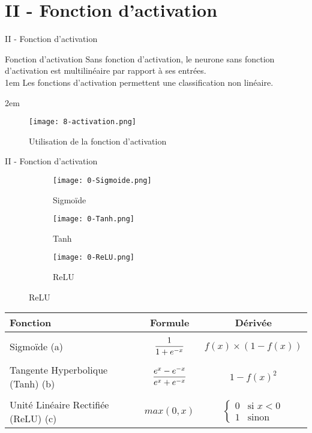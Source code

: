 \section{II - Fonction d'activation}
\begin{frame}{II - Fonction d'activation}
	\begin{block}{Fonction d'activation}
		Sans fonction d'activation, le neurone sans fonction d'activation est multilinéaire par rapport à ses entrées. \\
		\openup 1em
		Les fonctions d'activation permettent une classification non linéaire.
	\end{block}
	\openup 2em
	\begin{figure}
		\centering
		\texttt{[image: 8-activation.png]}
		\caption{Utilisation de la fonction d'activation}
	\end{figure}
\end{frame}


\begin{frame}{II - Fonction d'activation}
	\begin{figure}
		\begin{subfigure}[]{0.3\textwidth}
			\texttt{[image: 0-Sigmoide.png]}
			\caption{Sigmoïde}
		\end{subfigure}
		\begin{subfigure}[]{0.3\textwidth}
			\texttt{[image: 0-Tanh.png]}
			\caption{Tanh}
		\end{subfigure}
		\begin{subfigure}[]{0.3\textwidth}
			\texttt{[image: 0-ReLU.png]}
			\caption{ReLU}
		\end{subfigure}
	\end{figure}
	\begin{block}{}
		\centering
		\begin{tabular}{ l || c | c | }
			Fonction                            & Formule                                          & Dérivée                                    \\ \hline \\
			Sigmoïde (a)                        & $\mathlarger{\frac{1}{1+e^{-x}}}$                & $f(x) \times (1-f(x))$                     \\ \\
			Tangente Hyperbolique (Tanh) (b)    & $\mathlarger{\frac{e^{x}-e^{-x}}{e^{x}+e^{-x}}}$ & $1-f(x)^2$                                 \\ \\
			Unité Linéaire Rectifiée (ReLU) (c) & $max(0, x)$                                      & $ \left\{\begin{array}{ll}
					0 & \mbox{si } x<0 \\
					1 & \mbox{sinon }\end{array}\right.$ \\
		\end{tabular}
	\end{block}
\end{frame}


